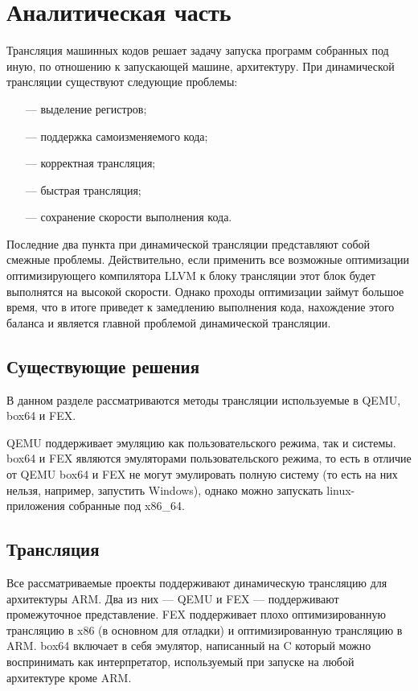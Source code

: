 \section{Аналитическая часть}
 
Трансляция машинных кодов решает задачу запуска программ собранных под иную, по отношению к запускающей машине, архитектуру. При динамической трансляции существуют следующие проблемы:

\begin{itemize}[leftmargin=1.6\parindent]
	\item[---] выделение регистров;
	\item[---] поддержка самоизменяемого кода;
	\item[---] корректная трансляция;
	\item[---] быстрая трансляция;
	\item[---] сохранение скорости выполнения кода.
\end{itemize}

Последние два пункта при динамической трансляции представляют собой смежные проблемы. Действительно, если применить все возможные оптимизации оптимизирующего компилятора LLVM к блоку трансляции этот блок будет выполнятся на высокой скорости. Однако проходы оптимизации займут большое время, что в итоге приведет к замедлению выполнения кода, нахождение этого баланса и является главной проблемой динамической трансляции. 

\subsection{Существующие решения}

В данном разделе рассматриваются методы трансляции используемые в QEMU, box64 и FEX.

QEMU поддерживает эмуляцию как пользовательского режима, так и системы. box64 и FEX являются эмуляторами пользовательского режима, то есть в отличие от QEMU box64 и FEX не могут эмулировать полную систему (то есть на них нельзя, например, запустить Windows), однако можно запускать linux-приложения собранные под x86\_64.

\subsection{Трансляция}

Все рассматриваемые проекты поддерживают динамическую трансляцию для архитектуры ARM. Два из них --- QEMU и FEX --- поддерживают промежуточное представление. FEX поддерживает плохо оптимизированную трансляцию в x86 (в основном для отладки) и оптимизированную трансляцию в ARM. box64 включает в себя эмулятор, написанный на C который можно воспринимать как интерпретатор, используемый при запуске на любой архитектуре кроме ARM.

